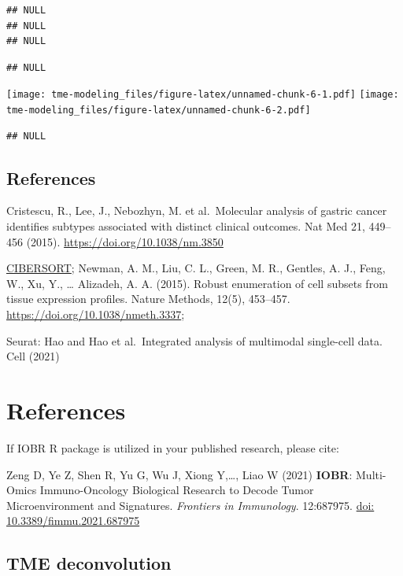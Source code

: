 \documentclass[
  12pt,
]{book}
\begin{document}
\begin{verbatim}
## NULL
## NULL
## NULL
\end{verbatim}

\begin{verbatim}
## NULL
\end{verbatim}

\texttt{[image: tme-modeling\_files/figure-latex/unnamed-chunk-6-1.pdf]} \texttt{[image: tme-modeling\_files/figure-latex/unnamed-chunk-6-2.pdf]}

\begin{verbatim}
## NULL
\end{verbatim}

\hypertarget{references-6}{%
\section{References}\label{references-6}}

Cristescu, R., Lee, J., Nebozhyn, M. et al.~Molecular analysis of gastric cancer identifies subtypes associated with distinct clinical outcomes. Nat Med 21, 449--456 (2015). \url{https://doi.org/10.1038/nm.3850}

\href{https://cibersort.stanford.edu/}{CIBERSORT}; Newman, A. M., Liu, C. L., Green, M. R., Gentles, A. J., Feng, W., Xu, Y., \ldots{} Alizadeh, A. A. (2015). Robust enumeration of cell subsets from tissue expression profiles. Nature Methods, 12(5), 453--457. \url{https://doi.org/10.1038/nmeth.3337};

Seurat: Hao and Hao et al.~Integrated analysis of multimodal single-cell data. Cell (2021)

\hypertarget{references-7}{%
\chapter{\texorpdfstring{\textbf{References}}{References}}\label{references-7}}

If IOBR R package is utilized in your published research, please cite:

Zeng D, Ye Z, Shen R, Yu G, Wu J, Xiong Y,\ldots, Liao W (2021) \textbf{IOBR}: Multi-Omics Immuno-Oncology Biological Research to Decode Tumor Microenvironment and Signatures. \emph{Frontiers in Immunology}. 12:687975. \href{https://www.frontiersin.org/articles/10.3389/fimmu.2021.687975/full}{doi: 10.3389/fimmu.2021.687975}

\hypertarget{tme-deconvolution-1}{%
\section{TME deconvolution}\label{tme-deconvolution-1}}
\end{document}
